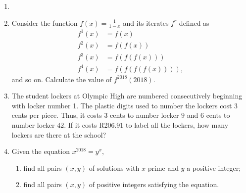 \documentclass{article}
\begin{document}
\begin{enumerate}[1.]
\vspace{6pt}
\item 


\vspace{6pt}
\item 
Consider the function $f(x) = \frac{1}{1-x}$ and its iterates $f^r$ defined as
\begin{align*}
  f^1(x) &= f(x) \\
  f^2(x) &= f(f(x)) \\
  f^3(x) &= f(f(f(x))) \\
  f^4(x) &= f(f(f(f(x)))),
\end{align*}
and so on. Calculate the value of $f^{2018}(2018)$.


\vspace{6pt}
\item %
The student lockers at Olympic High are numbered consecutively beginning with locker number 1. The plastic digits used to number the lockers cost $3$ cents per piece. Thus, it costs $3$ cents to number locker $9$ and $6$ cents to number locker $42$. If it costs R206.91 to label all the lockers, how many lockers are there at the school?


\vspace{6pt}
\item %
Given the equation $x^{2018} = y^x$,
\begin{enumerate}
  \item find all pairs $(x,y)$ of solutions with $x$ prime and $y$ a positive integer;
  \item find all pairs $(x,y)$ of positive integers satisfying the equation.
\end{enumerate}

\end{enumerate}


\vfill
\begin{center}
\begin{BVerbatim}

\end{BVerbatim}
\end{center}
\end{document}
